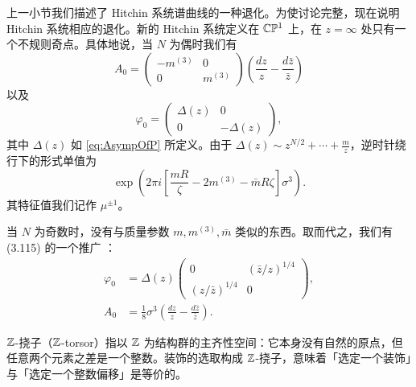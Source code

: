 上一小节我们描述了 Hitchin 系统谱曲线的一种退化。为使讨论完整，现在说明 Hitchin 系统相应的退化。新的 Hitchin 系统定义在 $\mathbb{C}\mathbb{P}^1$ 上，在 $z=\infty$ 处只有一个不规则奇点。具体地说，当 $N$ 为偶时我们有
\begin{equation}\label{eq:ch11-A0}
A_0 = \begin{pmatrix} -m^{(3)} & 0 \\ 0 & m^{(3)}
\end{pmatrix} \left( \frac{dz}{z} - \frac{d \bar z}{\bar z} \right)
\end{equation}
以及
\begin{equation}\label{eq:ch11-varphi0}
\varphi_0 = \begin{pmatrix} \Delta(z) & 0 \\  0 & - \Delta(z)
\end{pmatrix},
\end{equation}
其中 $\Delta(z)$ 如 \eqref{eq:AsympOfP} 所定义。由于 $\Delta(z) \sim z^{N/2} + \cdots + \frac{m}{z}$，逆时针绕行下的形式单值为
\begin{equation}\label{eq:MonodromyAtInfinity}
\exp \left(2\pi i \left[ \frac{mR}{\zeta} - 2 m^{(3)} - \bar m R
\zeta \right]\sigma^3 \right).
\end{equation}
其特征值我们记作 $\mu^{\pm 1}$。

当 $N$ 为奇数时，没有与质量参数 $m, m^{(3)}, \bar m$ 类似的东西。取而代之，我们有 (3.115) 的一个推广%
：
\begin{align}\label{eq:NoddBC}
\varphi_0 & = \Delta(z) \begin{pmatrix} 0 & (\bar z/z)^{1/4} \\
(z/\bar z)^{1/4} & 0 \end{pmatrix}, \\
A_0 & = \frac{1}{8} \sigma^3
\left(\frac{dz}{z} - \frac{d\bar z}{\bar z}\right).
\end{align}

\begin{yizhu}
$\mathbb{Z}$-挠子（$\mathbb{Z}$-torsor）指以 $\mathbb{Z}$ 为结构群的主齐性空间：它本身没有自然的原点，但任意两个元素之差是一个整数。装饰的选取构成 $\mathbb{Z}$-挠子，意味着「选定一个装饰」与「选定一个整数偏移」是等价的。
\end{yizhu}
